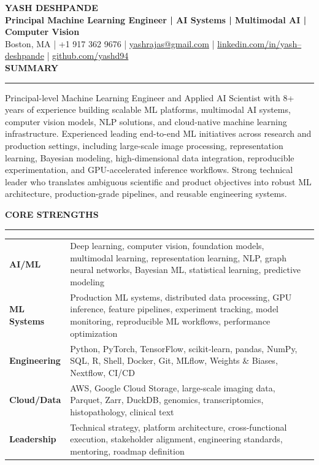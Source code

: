 \documentclass[10pt,letterpaper]{article}
\newcommand{\resumeHeader}[4]{%
  {\Huge\bfseries #1}\\[-1pt]
  {\large\bfseries\color{accent}#2}\\[3pt]
  {#3 \; | \; #4}\\[-2pt]
}
\begin{document}
\color{textgray}

\resumeHeader{YASH DESHPANDE}{Principal Machine Learning Engineer | AI Systems | Multimodal AI | Computer Vision}{Boston, MA | +1 917 362 9676 | \href{mailto:yashrajas@gmail.com}{yashrajas@gmail.com}}{\href{https://www.linkedin.com/in/yash--deshpande/}{linkedin.com/in/yash--deshpande} | \href{https://github.com/yashd94}{github.com/yashd94}}

\vspace{4pt}\textcolor{accent}{\large\bfseries SUMMARY}\vspace{2pt}\hrule\vspace{4pt}
Principal-level Machine Learning Engineer and Applied AI Scientist with 8+ years of experience building scalable ML platforms, multimodal AI systems, computer vision models, NLP solutions, and cloud-native machine learning infrastructure. Experienced leading end-to-end ML initiatives across research and production settings, including large-scale image processing, representation learning, Bayesian modeling, high-dimensional data integration, reproducible experimentation, and GPU-accelerated inference workflows. Strong technical leader who translates ambiguous scientific and product objectives into robust ML architecture, production-grade pipelines, and reusable engineering systems.

\vspace{6pt}\textcolor{accent}{\large\bfseries CORE STRENGTHS}\vspace{2pt}\hrule\vspace{4pt}
\begin{tabularx}{\textwidth}{>{\bfseries\color{accent}}p{1.15in} X}
AI/ML & Deep learning, computer vision, foundation models, multimodal learning, representation learning, NLP, graph neural networks, Bayesian ML, statistical learning, predictive modeling \\
ML Systems & Production ML systems, distributed data processing, GPU inference, feature pipelines, experiment tracking, model monitoring, reproducible ML workflows, performance optimization \\
Engineering & Python, PyTorch, TensorFlow, scikit-learn, pandas, NumPy, SQL, R, Shell, Docker, Git, MLflow, Weights \& Biases, Nextflow, CI/CD \\
Cloud/Data & AWS, Google Cloud Storage, large-scale imaging data, Parquet, Zarr, DuckDB, genomics, transcriptomics, histopathology, clinical text \\
Leadership & Technical strategy, platform architecture, cross-functional execution, stakeholder alignment, engineering standards, mentoring, roadmap definition
\end{tabularx}
\end{document}
